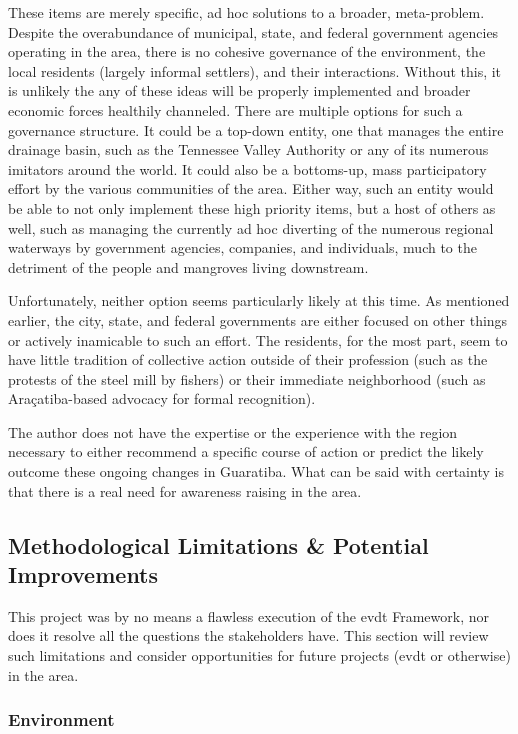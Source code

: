 These items are merely specific, ad hoc solutions to a broader, meta-problem. Despite the overabundance of municipal, state, and federal government agencies operating in the area, there is no cohesive governance of the environment, the local residents (largely informal settlers), and their interactions. Without this, it is unlikely the any of these ideas will be properly implemented and broader economic forces healthily channeled. There are multiple options for such a governance structure. It could be a top-down entity, one that manages the entire drainage basin, such as the Tennessee Valley Authority or any of its numerous imitators around the world. It could also be a bottoms-up, mass participatory effort by the various communities of the area. Either way, such an entity would be able to not only implement these high priority items, but a host of others as well, such as managing the currently ad hoc diverting of the numerous regional waterways by government agencies, companies, and individuals, much to the detriment of the people and mangroves living downstream.

Unfortunately, neither option seems particularly likely at this time. As mentioned earlier, the city, state, and federal governments are either focused on other things or actively inamicable to such an effort. The residents, for the most part, seem to have little tradition of collective action outside of their profession (such as the protests of the steel mill by fishers) or their immediate neighborhood (such as Araçatiba-based advocacy for formal recognition). 

The author does not have the expertise or the experience with the region necessary to either recommend a specific course of action or predict the likely outcome these ongoing changes in Guaratiba. What can be said with certainty is that there is a real need for awareness raising in the area.

\subsection{Methodological Limitations \& Potential Improvements} \label{sec:rio-limitations}

This project was by no means a flawless execution of the \ac{evdt} Framework, nor does it resolve all the questions the stakeholders have. This section will review such limitations and consider opportunities for future projects (\ac{evdt} or otherwise) in the area. 

\subsubsection{Environment}

